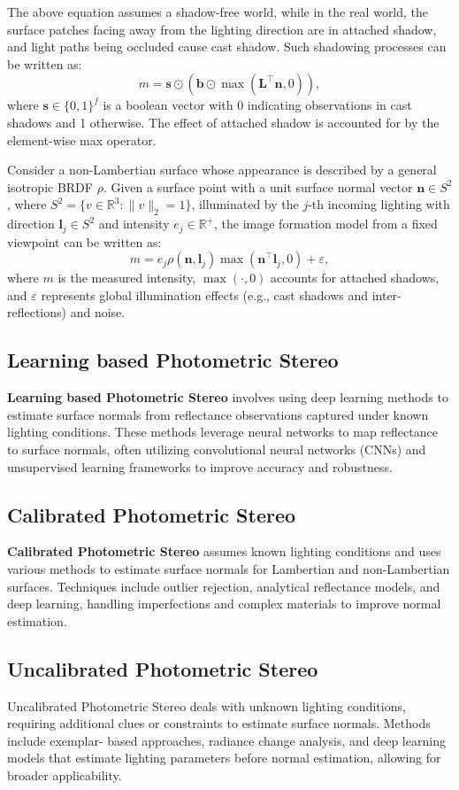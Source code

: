 The above equation assumes a shadow-free world, while in the real world, the surface patches facing away from the lighting direction are in attached shadow, and light paths being occluded cause cast shadow. Such shadowing processes can be written as:
\[ m = \mathbf{s} \odot (\mathbf{b} \odot \max(\mathbf{L}^\top \mathbf{n}, 0)), \]
where $\mathbf{s} \in \{0, 1\}^f$ is a boolean vector with 0 indicating observations in cast shadows and 1 otherwise. The effect of attached shadow is accounted for by the element-wise max operator.

Consider a non-Lambertian surface whose appearance is described by a general isotropic BRDF $\rho$. Given a surface point with a unit surface normal vector $\mathbf{n} \in S^2$, where $S^2 = \{v \in \mathbb{R}^3 : \|v\|_2 = 1\}$, illuminated by the $j$-th incoming lighting with direction $\mathbf{l}_j \in S^2$ and intensity $e_j \in \mathbb{R}^+$, the image formation model from a fixed viewpoint can be written as:
\[ m = e_j \rho(\mathbf{n}, \mathbf{l}_j) \max(\mathbf{n}^\top \mathbf{l}_j, 0) + \varepsilon, \]
where $m$ is the measured intensity, $\max(\cdot, 0)$ accounts for attached shadows, and $\varepsilon$ represents global illumination effects (e.g., cast shadows and inter-reflections) and noise.

\subsection{Learning based Photometric Stereo}
\textbf{Learning based Photometric Stereo} involves using deep learning methods to estimate surface normals from reflectance observations captured under known lighting conditions. These methods leverage neural networks to map reflectance to surface normals, often utilizing convolutional neural networks (CNNs) and unsupervised learning
frameworks to improve accuracy and robustness.

\subsection{Calibrated Photometric Stereo}
\textbf{Calibrated Photometric Stereo} assumes known lighting conditions and uses various
methods to estimate surface normals for Lambertian and non-Lambertian surfaces.
Techniques include outlier rejection, analytical reflectance models, and deep learning,
handling imperfections and complex materials to improve normal estimation.

\subsection{Uncalibrated Photometric Stereo}
Uncalibrated Photometric Stereo deals with unknown lighting conditions, requiring additional clues or constraints to estimate surface normals. Methods include exemplar- based approaches, radiance change analysis, and deep learning models that estimate lighting parameters before normal estimation, allowing for broader applicability.


